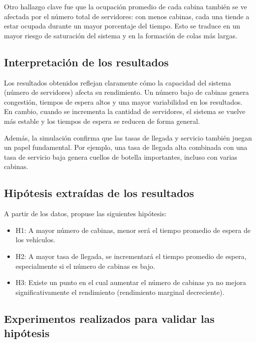 \documentclass[12pt]{article}
\begin{document}
    Otro hallazgo clave fue que la ocupación promedio de cada cabina también se ve afectada por el número total de servidores: con menos cabinas, cada una tiende a estar ocupada durante un mayor porcentaje del tiempo. Esto se traduce en un mayor riesgo de saturación del sistema y en la formación de colas más largas.
    
    \subsection*{Interpretación de los resultados}
    
    Los resultados obtenidos reflejan claramente cómo la capacidad del sistema (número de servidores) afecta su rendimiento. Un número bajo de cabinas genera congestión, tiempos de espera altos y una mayor variabilidad en los resultados. En cambio, cuando se incrementa la cantidad de servidores, el sistema se vuelve más estable y los tiempos de espera se reducen de forma general.
    
    Además, la simulación confirma que las tasas de llegada y servicio también juegan un papel fundamental. Por ejemplo, una tasa de llegada alta combinada con una tasa de servicio baja genera cuellos de botella importantes, incluso con varias cabinas.
    
    \subsection*{Hipótesis extraídas de los resultados}
    
    A partir de los datos, propuse las siguientes hipótesis:
    
    \begin{itemize}
      \item H1: A mayor número de cabinas, menor será el tiempo promedio de espera de los vehículos.
      \item H2: A mayor tasa de llegada, se incrementará el tiempo promedio de espera, especialmente si el número de cabinas es bajo.
      \item H3: Existe un punto en el cual aumentar el número de cabinas ya no mejora significativamente el rendimiento (rendimiento marginal decreciente).
    \end{itemize}
    
    \subsection*{Experimentos realizados para validar las hipótesis}
    
\end{document}
